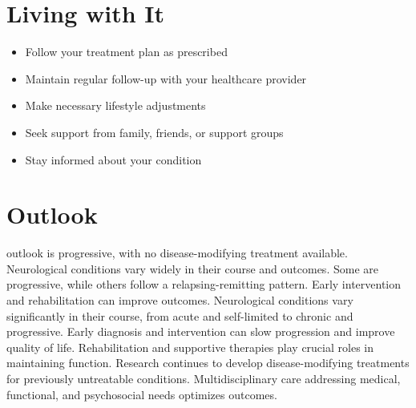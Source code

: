 \section{Living with It}
\begin{itemize}[noitemsep]
  \item Follow your treatment plan as prescribed
  \item Maintain regular follow-up with your healthcare provider
  \item Make necessary lifestyle adjustments
  \item Seek support from family, friends, or support groups
  \item Stay informed about your condition
\end{itemize}
\section{Outlook}
outlook is progressive, with no disease-modifying treatment available. Neurological conditions vary widely in their course and outcomes. Some are progressive, while others follow a relapsing-remitting pattern. Early intervention and rehabilitation can improve outcomes. Neurological conditions vary significantly in their course, from acute and self-limited to chronic and progressive. Early diagnosis and intervention can slow progression and improve quality of life. Rehabilitation and supportive therapies play crucial roles in maintaining function. Research continues to develop disease-modifying treatments for previously untreatable conditions. Multidisciplinary care addressing medical, functional, and psychosocial needs optimizes outcomes.
